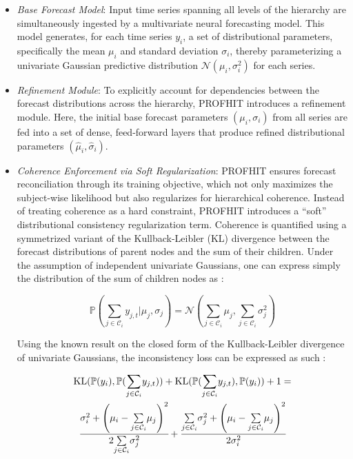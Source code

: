 \documentclass[letterpaper]{article}
\begin{document}
\begin{itemize}

    \item \textit{Base Forecast Model}: Input time series spanning all levels of the hierarchy are simultaneously ingested by a multivariate neural forecasting model. This model generates, for each time series $y_i$, a set of distributional parameters, specifically the mean $ \mu_i $ and standard deviation $ \sigma_i $, thereby parameterizing a univariate Gaussian predictive distribution $\mathcal{N}(\mu_i, \sigma_i^2)$ for each series.

    \item \textit{Refinement Module}: To explicitly account for dependencies between the forecast distributions across the hierarchy, PROFHIT introduces a refinement module. Here, the initial base forecast parameters $(\mu_i, \sigma_i)$ from all series are fed into a set of dense, feed-forward layers that produce refined distributional parameters $( \hat{\mu}_i, \hat{\sigma}_i )$.

    \item \textit{Coherence Enforcement via Soft Regularization}: PROFHIT ensures forecast reconciliation through its training objective, which not only maximizes the subject-wise likelihood but also regularizes for hierarchical coherence. Instead of treating coherence as a hard constraint, PROFHIT introduces a “soft” distributional consistency regularization term. Coherence is quantified using a symmetrized variant of the Kullback-Leibler (KL) divergence between the forecast distributions of parent nodes and the sum of their children. Under the assumption of independent univariate Gaussians, one can express simply the distribution of the sum of children nodes as :
    
    \begin{equation}
     \mathbb{P}(\underset{j\in \mathcal{C}_i}{\sum}y_{j,t}| \mu_j , \sigma_j) =  \mathcal{N}(\underset{j\in \mathcal{C}_i}{\sum}\mu_j, { \underset{j\in \mathcal{C}_i}{\sum}\sigma^2_j})
    \end{equation}

    Using the known result on the closed form of the Kullback-Leibler divergence of univariate Gaussians, the inconsistency loss can be expressed as such :

  
    \begin{multline} 
    \mathrm{KL}(\mathbb{P}(y_i),\mathbb{P}(\underset{j\in \mathcal{C}_i} {\sum}y_{j,t})) + \mathrm{KL}(\mathbb{P}(\underset{j\in \mathcal{C}_i} {\sum}y_{j,t}),\mathbb{P}(y_i))+ 1 = \\ \cfrac{\sigma_i^2 + \left(\mu_i - \underset{j\in \mathcal{C}_i}{\sum}\mu_j \right)^2}{2{\underset{j\in \mathcal{C}_i}{\sum}\sigma^2_j}} + \cfrac{\underset{j\in \mathcal{C}_i}{\sum}\sigma^2_j + \left(\mu_i - \underset{j\in \mathcal{C}_i}{\sum}\mu_j \right)^2 }{2\sigma_i^2}
    \end{multline}

\end{itemize}
\end{document}
